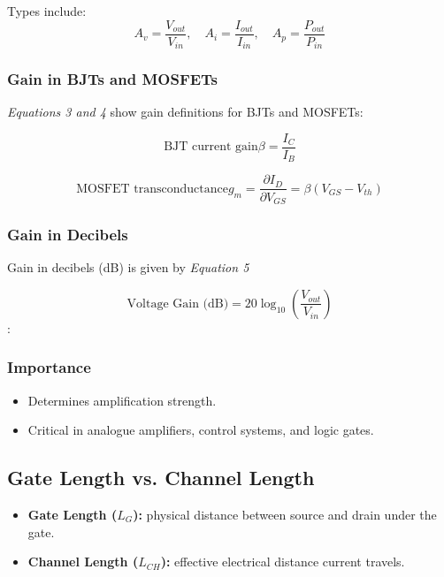 \documentclass[a4paper,12pt]{article}
\begin{document}
Types include:
\begin{equation}
A_v = \frac{V_{out}}{V_{in}}, \quad
A_i = \frac{I_{out}}{I_{in}}, \quad
A_p = \frac{P_{out}}{P_{in}}
\end{equation}

\subsubsection{Gain in BJTs and MOSFETs}

\textit{Equations 3 and 4} show gain definitions for BJTs and MOSFETs:

\begin{equation}
    \text{BJT current gain} \beta = \frac{I_C}{I_B}
\end{equation}

\begin{equation}
    \text{MOSFET transconductance} g_m = \frac{\partial I_D}{\partial V_{GS}} = \beta(V_{GS} - V_{th})
\end{equation}

\subsubsection{Gain in Decibels}
Gain in decibels (dB) is given by \textit{Equation 5}

\begin{equation}
\text{Voltage Gain (dB)} = 20 \log_{10}\left(\frac{V_{out}}{V_{in}}\right)    
\end{equation}:


\subsubsection{Importance}
\begin{itemize}
    \item Determines amplification strength.
    \item Critical in analogue amplifiers, control systems, and logic gates.
\end{itemize}

\subsection{Gate Length vs. Channel Length}

\begin{itemize}
    \item \textbf{Gate Length ($L_G$):} physical distance between source and drain under the gate.
    \item \textbf{Channel Length ($L_{CH}$):} effective electrical distance current travels.
\end{itemize}
\end{document}

